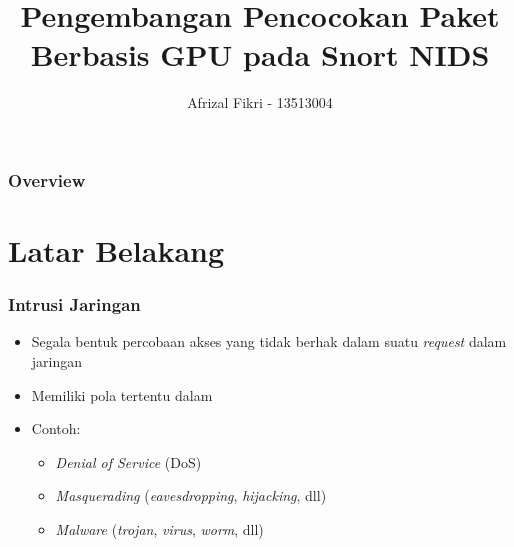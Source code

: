 \documentclass{beamer}
\title[]{Pengembangan Pencocokan Paket Berbasis GPU pada Snort NIDS} %
\author{Afrizal Fikri - 13513004} %
\begin{document}
\begin{frame}
\titlepage %
\end{frame}

\begin{frame}
\frametitle{Overview} %
\tableofcontents %
\end{frame}


\section{Latar Belakang} %

  \begin{frame}
  \frametitle{Intrusi Jaringan}
  \begin{itemize}
    \item Segala bentuk percobaan akses yang tidak berhak dalam suatu \emph{request} dalam jaringan
    \item Memiliki pola tertentu dalam 
    \item Contoh:
      \begin{itemize}
        \item \emph{Denial of Service} (DoS)
        \item \emph{Masquerading} (\emph{eavesdropping}, \emph{hijacking}, dll)
        \item \emph{Malware} (\emph{trojan}, \emph{virus}, \emph{worm}, dll)
      \end{itemize}
  \end{itemize}
  \end{frame}
\end{document}
